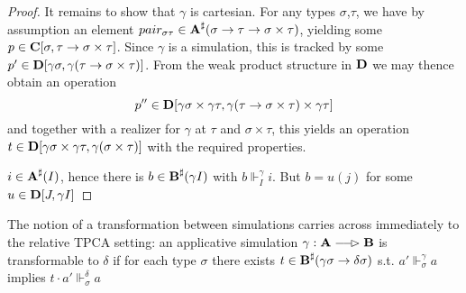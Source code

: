 \documentclass[11pt]{article}
\begin{document}
\begin{proof}
It remains to show that \(\gamma\) is cartesian. For any types \(\sigma\),\(\tau\), we have by assumption an element
\(pair_{\sigma\tau}\in\operatorname{\textbf{A}}^\sharp(\sigma\to\tau\to\sigma\times\tau)\), yielding some \(p\in\operatorname{\textbf{C}}[\sigma,\tau\to\sigma\times\tau]\). Since \(\gamma\) is a simulation, this is
tracked by some \(p'\in\operatorname{\textbf{D}}[\gamma\sigma,\gamma(\tau\to\sigma\times\tau)]\). From the weak product structure in \(\operatorname{\textbf{D}}\) we may thence
obtain an operation
\begin{equation*}
p''\in\operatorname{\textbf{D}}[\gamma\sigma\times\gamma\tau,\gamma(\tau\to\sigma\times\tau)\times\gamma\tau]
\end{equation*}
and together with a realizer for \(\gamma\) at \(\tau\) and \(\sigma\times\tau\), this yields an
operation \(t\in\operatorname{\textbf{D}}[\gamma\sigma\times\gamma\tau,\gamma(\sigma\times\tau)]\) with the required properties.

\(i\in\operatorname{\textbf{A}}^\sharp(I)\), hence there is \(b\in\operatorname{\textbf{B}}^\sharp(\gamma I)\) with \(b\Vdash_I^\gamma i\). But \(b=u(j)\) for
some \(u\in\operatorname{\textbf{D}}[J,\gamma I]\)
\end{proof}

The notion of a transformation between simulations carries across immediately to the relative
TPCA setting: an applicative simulation \(\gamma:\bA\lrarhd\bB\) is transformable to \(\delta\) if for each type
\(\sigma\) there exists \(t\in\operatorname{\textbf{B}}^\sharp(\gamma\sigma\to\delta\sigma)\) s.t. \(a'\Vdash_\sigma^\gamma a\) implies \(t\cdot a'\Vdash_\sigma^\delta a\)
\end{document}
